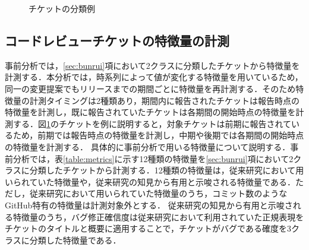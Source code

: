 \documentclass[11pt]{jreport}
\begin{document}
\begin{figure}[h]
\begin{center}
\caption{チケットの分類例}
\label{fig:labeling}
\end{center}
\end{figure}


\subsection{コードレビューチケットの特徴量の計測}\label{sec:metrics}
事前分析では，\ref{sec:bunrui}項において2クラスに分類したチケットから特徴量を計測する．本分析では，時系列によって値が変化する特徴量を用いているため，同一の変更提案でもリリースまでの期間ごとに特徴量を再計測する．そのため特徴量の計測タイミングは2種類あり，期間内に報告されたチケットは報告時点の特徴量を計測し，既に報告されていたチケットは各期間の開始時点の特徴量を計測する．図\ref{fig:labeling}のチケットを例に説明すると，対象チケットは前期に報告されているため，前期では報告時点の特徴量を計測し，中期や後期では各期間の開始時点の特徴量を計測する．
具体的に事前分析で用いる特徴量について説明する．事前分析では，表\ref{table:metrics}に示す12種類の特徴量を\ref{sec:bunrui}項において2クラスに分類したチケットから計測する．12種類の特徴量は，従来研究\cite{prioritizer}において用いられていた特徴量や，従来研究\cite{release_merge}\cite{review1}の知見から有用と示唆される特徴量である．ただし，従来研究\cite{prioritizer}において用いられていた特徴量のうち，コミット数のようなGitHub特有の特徴量は計測対象外とする．
従来研究\cite{release_merge}\cite{review1}の知見から有用と示唆される特徴量のうち，バグ修正確信度は従来研究\cite{bug}において利用されていた正規表現をチケットのタイトルと概要に適用することで，チケットがバグである確度を3クラスに分類した特徴量である．
\end{document}
